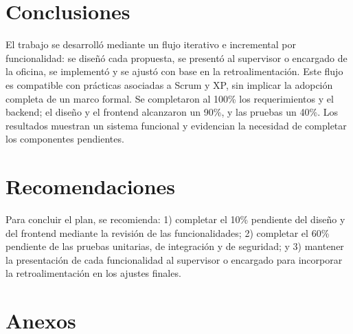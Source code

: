 \documentclass[12pt,a4paper]{article}
\begin{document}



    \newpage
    \tableofcontents %
    \newpage
    \listoffigures %
    \newpage
    \listoftables %
\pagestyle{fancy} \mystyle \newpage %
\doublespacing

\renewcommand{\thesection}{\Roman{section}}
\renewcommand{\thesubsection}{\arabic{section}.\arabic{subsection}}







%
%
%
%



\section{Conclusiones}
El trabajo se desarrolló mediante un flujo iterativo e incremental por funcionalidad: se diseñó cada propuesta, se presentó al supervisor o encargado de la oficina, se implementó y se ajustó con base en la retroalimentación. Este flujo es compatible con prácticas asociadas a Scrum y XP, sin implicar la adopción completa de un marco formal. Se completaron al 100\% los requerimientos y el backend; el diseño y el frontend alcanzaron un 90\%, y las pruebas un 40\%. Los resultados muestran un sistema funcional y evidencian la necesidad de completar los componentes pendientes.
\section{Recomendaciones}
Para concluir el plan, se recomienda: 1) completar el 10\% pendiente del diseño y del frontend mediante la revisión de las funcionalidades; 2) completar el 60\% pendiente de las pruebas unitarias, de integración y de seguridad; y 3) mantener la presentación de cada funcionalidad al supervisor o encargado para incorporar la retroalimentación en los ajustes finales.

\newpage
\section{Anexos}
\end{document}
